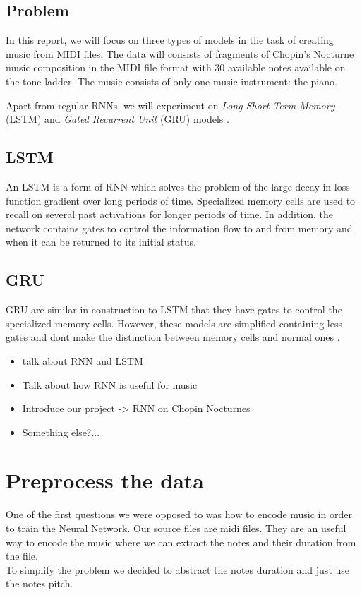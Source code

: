 \documentclass[11pt]
{article}
\begin{document}
\subsection{Problem}
In this report, we will focus on three types of models in the task of creating music from MIDI files. The data will consists of fragments of Chopin's Nocturne music composition in the MIDI file format with 30 available notes available on the tone ladder. The music consists of only one music instrument: the piano.

Apart from regular RNNs, we will experiment on \textit{Long Short-Term Memory} (LSTM)\cite{Hochreiter:1997:LSM:1246443.1246450} and \textit{Gated Recurrent Unit } (GRU) models \cite{Cho}.

\subsection{LSTM}
An LSTM is a form of RNN which solves the problem of the large decay in loss function gradient over long periods of time. Specialized memory cells are used to recall on several past activations for longer periods of time. In addition, the network contains gates to control the information flow to and from memory and when it can be returned to its initial status.

\subsection{GRU}
GRU are similar in construction to LSTM that they have gates to control the specialized memory cells. However, these models are simplified containing less gates and dont make the distinction between memory cells and normal ones \cite{Chung}.



\begin{itemize}
	\item talk about RNN and LSTM
	\item Talk about how RNN is useful for music
	\item Introduce our project -> RNN on Chopin Nocturnes
	\item Something else?...
\end{itemize}


\section{Preprocess the data}
One of the first questions we were opposed to was how to encode music in order to train the Neural Network. Our source files are midi files. They are an useful way to encode the music where we can extract the notes and their duration from the file.\\
To simplify the problem we decided to abstract the notes duration and just use the notes pitch. \\
\end{document}
